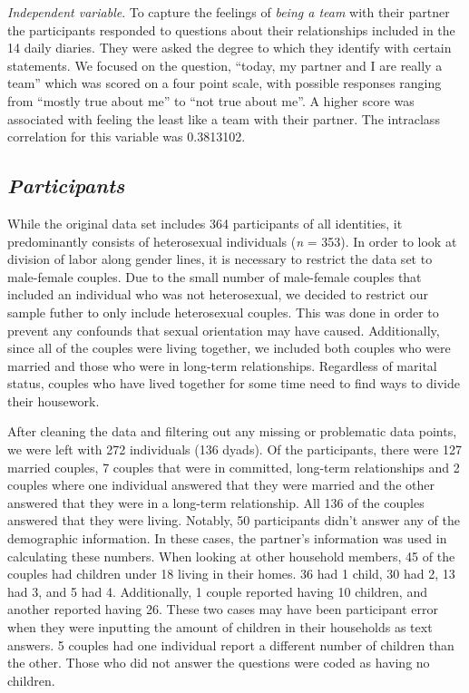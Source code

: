 \documentclass[
  english,
  man]{apa6}
\begin{document}
\emph{Independent variable}. To capture the feelings of \emph{being a team} with their partner the participants responded to questions about their relationships included in the 14 daily diaries. They were asked the degree to which they identify with certain statements. We focused on the question, \enquote{today, my partner and I are really a team} which was scored on a four point scale, with possible responses ranging from \enquote{mostly true about me} to \enquote{not true about me}. A higher score was associated with feeling the least like a team with their partner. The intraclass correlation for this variable was 0.3813102.

\hypertarget{participants}{%
\subsection{\texorpdfstring{\emph{Participants}}{Participants}}\label{participants}}

While the original data set includes 364 participants of all identities, it predominantly consists of heterosexual individuals (\emph{n} = 353). In order to look at division of labor along gender lines, it is necessary to restrict the data set to male-female couples. Due to the small number of male-female couples that included an individual who was not heterosexual, we decided to restrict our sample futher to only include heterosexual couples. This was done in order to prevent any confounds that sexual orientation may have caused. Additionally, since all of the couples were living together, we included both couples who were married and those who were in long-term relationships. Regardless of marital status, couples who have lived together for some time need to find ways to divide their housework.

After cleaning the data and filtering out any missing or problematic data points, we were left with 272 individuals (136 dyads). Of the participants, there were 127 married couples, 7 couples that were in committed, long-term relationships and 2 couples where one individual answered that they were married and the other answered that they were in a long-term relationship. All 136 of the couples answered that they were living. Notably, 50 participants didn't answer any of the demographic information. In these cases, the partner's information was used in calculating these numbers. When looking at other household members, 45 of the couples had children under 18 living in their homes. 36 had 1 child, 30 had 2, 13 had 3, and 5 had 4. Additionally, 1 couple reported having 10 children, and another reported having 26. These two cases may have been participant error when they were inputting the amount of children in their households as text answers. 5 couples had one individual report a different number of children than the other. Those who did not answer the questions were coded as having no children.
\end{document}
